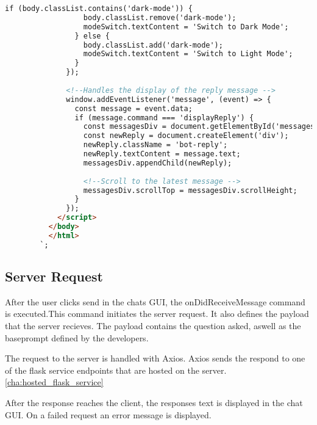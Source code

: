 \begin{lstlisting}[language=HTML, caption={IDE Chat GUI}]
                if (body.classList.contains('dark-mode')) {
                  body.classList.remove('dark-mode');
                  modeSwitch.textContent = 'Switch to Dark Mode';
                } else {
                  body.classList.add('dark-mode');
                  modeSwitch.textContent = 'Switch to Light Mode';
                }
              });
      
              <!--Handles the display of the reply message -->
              window.addEventListener('message', (event) => {
                const message = event.data;
                if (message.command === 'displayReply') {
                  const messagesDiv = document.getElementById('messages');
                  const newReply = document.createElement('div');
                  newReply.className = 'bot-reply';
                  newReply.textContent = message.text;
                  messagesDiv.appendChild(newReply);
      
                  <!--Scroll to the latest message -->
                  messagesDiv.scrollTop = messagesDiv.scrollHeight;
                }
              });
            </script>
          </body>
          </html>
        `;
\end{lstlisting}



\subsection{Server Request}

After the user clicks send in the chats GUI, the onDidReceiveMessage command is executed.This command initiates the server request.
It also defines the payload that the server recieves. The payload contains the question asked, aswell as the baseprompt defined by the developers. 

The request to the server is handled with Axios. Axios sends the respond to one of the flask service endpoints that are hosted on the server.
\ref{cha:hosted_flask_service}

After the response reaches the client, the responses text is displayed in the chat GUI.
On a failed request an error message is displayed.

